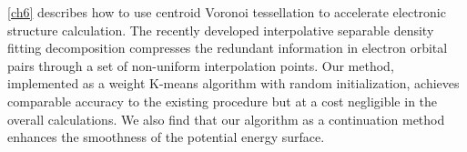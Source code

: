 \cref{ch6} describes how to use centroid Voronoi tessellation to accelerate
electronic structure calculation. The recently developed interpolative separable
density fitting decomposition compresses the redundant information in electron
orbital pairs through a set of non-uniform interpolation points. Our method,
implemented as a weight K-means algorithm with random initialization, achieves
comparable accuracy to the existing procedure but at a cost negligible in the
overall calculations. We also find that our algorithm as a continuation method
enhances the smoothness of the potential energy surface.